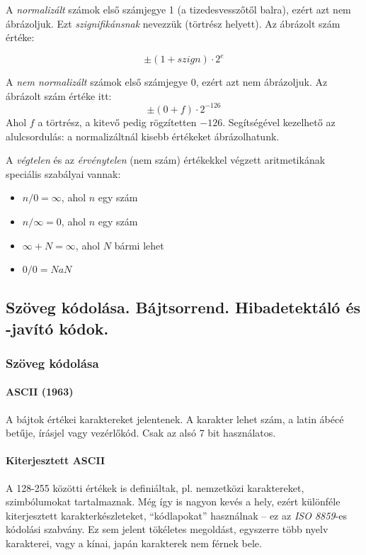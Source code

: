 \documentclass[a4paper]{article}
\begin{document}
A \emph{normalizált} számok első számjegye 1 (a tizedesvesszőtől balra), ezért azt nem ábrázoljuk. Ezt \emph{szignifikánsnak} nevezzük (törtrész helyett). Az ábrázolt szám értéke:

$$\pm (1 + szign) \cdot 2^{e}$$

A \emph{nem normalizált} számok első számjegye 0, ezért azt nem ábrázoljuk. Az ábrázolt szám értéke itt:
$$\pm (0 + f) \cdot 2^{-126}$$
Ahol $f$ a törtrész, a kitevő pedig rögzítetten $-126$. Segítségével kezelhető az alulcsordulás: a normalizáltnál kisebb értékeket ábrázolhatunk.

A \emph{végtelen} és az \emph{érvénytelen} (nem szám) értékekkel végzett aritmetikának speciális szabályai vannak:
\begin{itemize}
	\item $n/0=\infty$, ahol $n$ egy szám
	\item $n/\infty=0$, ahol $n$ egy szám
	\item $\infty + N=\infty$, ahol $N$ bármi lehet
	\item $0/0=NaN$
\end{itemize}

\subsection{Szöveg kódolása. Bájtsorrend. Hibadetektáló és -javító kódok.}

\subsubsection{Szöveg kódolása}

\paragraph{ASCII (1963)} A bájtok értékei karaktereket jelentenek. A karakter lehet szám, a latin ábécé betűje, írásjel vagy vezérlőkód. Csak az alsó 7 bit használatos.

\paragraph{Kiterjesztett ASCII} A 128-255 közötti értékek is definiáltak, pl. nemzetközi karaktereket, szimbólumokat tartalmaznak. Még így is nagyon kevés a hely, ezért különféle kiterjesztett karakterkészleteket, ``kódlapokat'' használnak -- ez az \emph{ISO 8859}-es kódolási szabvány. Ez sem jelent tökéletes megoldást, egyszerre több nyelv karakterei, vagy a kínai, japán karakterek nem férnek bele.
\end{document}
